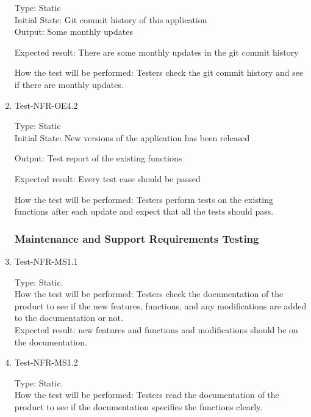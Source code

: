 \documentclass[12pt, titlepage]{article}
\begin{document}
\begin{enumerate}
Type: Static\\

Initial State: Git commit history of this application\\

Output: Some monthly updates

Expected result: There are some monthly updates in the git commit history

How the test will be performed: Testers check the git commit history and see if there are monthly updates.

\item{Test-NFR-OE4.2\\}

Type: Static\\

Initial State: New versions of the application has been released

Output: Test report of the existing functions

Expected result: Every test case should be passed

How the test will be performed: Testers perform tests on the existing functions after each update and expect that all the tests should pass.

\subsubsection{Maintenance and Support Requirements Testing}

\item{Test-NFR-MS1.1\\}

Type: Static.\\

How the test will be performed: Testers check the documentation of the product to see if the new features, functions, and any modifications are added to the documentation or not.\\

Expected result: new features and functions and modifications should be on the documentation.

\item{Test-NFR-MS1.2\\}

Type: Static.\\

How the test will be performed: Testers read the documentation of the product to see if the documentation specifies the functions clearly.\\


\end{enumerate}
\end{document}
